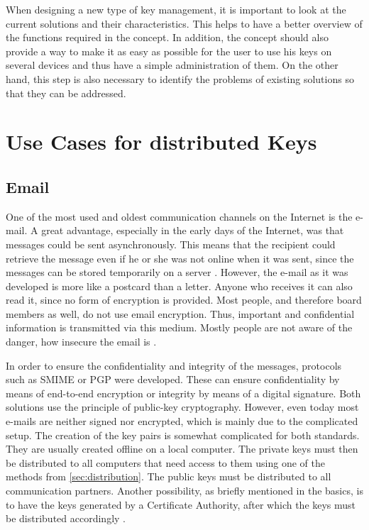 \documentclass[12pt,oneside,a4paper,parskip]{scrbook}
\begin{document}
When designing a new type of key management, it is important to look at the current solutions and their characteristics. This helps to have a better overview of the functions required in the concept. In addition, the concept should also provide a way to make it as easy as possible for the user to use his keys on several devices and thus have a simple administration of them. On the other hand, this step is also necessary to identify the problems of existing solutions so that they can be addressed.

\section{Use Cases for distributed Keys}

\subsection{Email}
One of the most used and oldest communication channels on the Internet is the e-mail. A great advantage, especially in the early days of the Internet, was that messages could be sent asynchronously. This means that the recipient could retrieve the message even if he or she was not online when it was sent, since the messages can be stored temporarily on a server \parencite{van_vleck_electronic_2012}. \newline
However, the e-mail as it was developed is more like a postcard than a letter. Anyone who receives it can also read it, since no form of encryption is provided. Most people, and therefore board members as well, do not use email encryption. Thus, important and confidential information is transmitted via this medium. Mostly people are not aware of the danger, how insecure the email is \parencite{managers_mail_2019}. \newline

In order to ensure the confidentiality and integrity of the messages, protocols such as SMIME or PGP were developed. These can ensure confidentiality by means of end-to-end encryption or integrity by means of a digital signature. Both solutions use the principle of public-key cryptography. However, even today most e-mails are neither signed nor encrypted, which is mainly due to the complicated setup. The creation of the key pairs is somewhat complicated for both standards. They are usually created offline on a local computer. The private keys must then be distributed to all computers that need access to them using one of the methods from \ref{sec:distribution}. The public keys must be distributed to all communication partners. Another possibility, as briefly mentioned in the basics, is to have the keys generated by a Certificate Authority, after which the keys must be distributed accordingly \parencite{kirsch_2001}.
\end{document}
